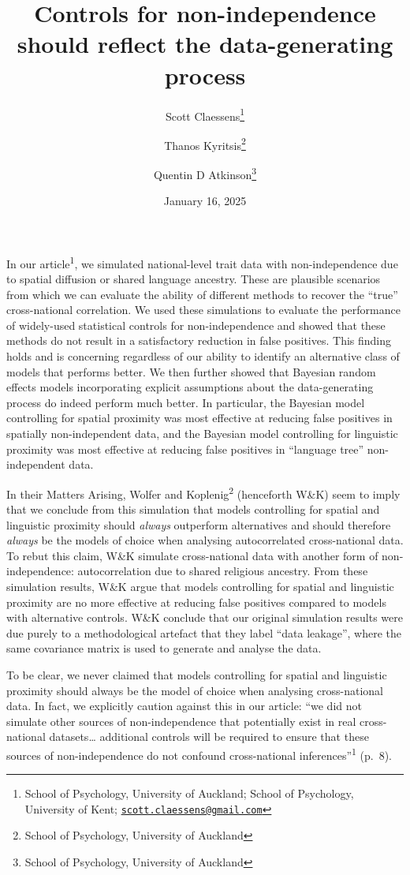 \documentclass[
  11pt,
]{article}
\title{Controls for non-independence should reflect the data-generating process}
\author{Scott Claessens\footnote{School of Psychology, University of Auckland; School of Psychology, University of Kent; \href{mailto:scott.claessens@gmail.com}{\nolinkurl{scott.claessens@gmail.com}}} \and Thanos Kyritsis\footnote{School of Psychology, University of Auckland} \and Quentin D Atkinson\footnote{School of Psychology, University of Auckland}}
\date{January 16, 2025}
\begin{document}
\maketitle

\linenumbers

In our article\textsuperscript{1}, we simulated national-level trait data with
non-independence due to spatial diffusion or shared language ancestry. These are
plausible scenarios from which we can evaluate the ability of different methods
to recover the ``true'' cross-national correlation. We used these simulations to
evaluate the performance of widely-used statistical controls for
non-independence and showed that these methods do not result in a satisfactory
reduction in false positives. This finding holds and is concerning regardless of
our ability to identify an alternative class of models that performs better. We
then further showed that Bayesian random effects models incorporating explicit
assumptions about the data-generating process do indeed perform much better. In
particular, the Bayesian model controlling for spatial proximity was most
effective at reducing false positives in spatially non-independent data, and the
Bayesian model controlling for linguistic proximity was most effective at
reducing false positives in ``language tree'' non-independent data.

In their Matters Arising, Wolfer and Koplenig\textsuperscript{2} (henceforth W\&K) seem
to imply that we conclude from this simulation that models controlling for
spatial and linguistic proximity should \emph{always} outperform alternatives and
should therefore \emph{always} be the models of choice when analysing autocorrelated
cross-national data. To rebut this claim, W\&K simulate cross-national data with
another form of non-independence: autocorrelation due to shared religious
ancestry. From these simulation results, W\&K argue that models controlling for
spatial and linguistic proximity are no more effective at reducing false
positives compared to models with alternative controls. W\&K conclude that our
original simulation results were due purely to a methodological artefact that
they label ``data leakage'', where the same covariance matrix is used to generate
and analyse the data.

To be clear, we never claimed that models controlling for spatial and linguistic
proximity should always be the model of choice when analysing cross-national
data. In fact, we explicitly caution against this in our article: ``we did not
simulate other sources of non-independence that potentially exist in real
cross-national datasets\ldots{} additional controls will be required to ensure that
these sources of non-independence do not confound cross-national
inferences''\textsuperscript{1} (p.~8).
\end{document}
